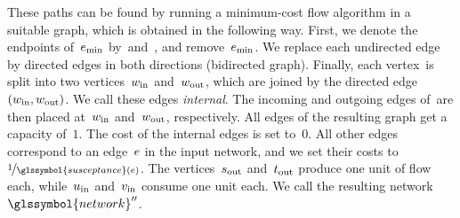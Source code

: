 These paths can be found by running a minimum-cost flow algorithm in a suitable
graph, which is obtained in the following way. First, we denote the endpoints
of~$e_{\min}$ by~\vertexa and~\vertexb, and remove~$e_{\min}$. We
replace each undirected edge by directed edges in both directions (bidirected
graph). Finally, each vertex~\vertexc is split into two
vertices~$w_\mathrm{in}$ and~$w_\mathrm{out}$, which are joined by
the directed edge $(w_\mathrm{in},w_\mathrm{out})$. We call these
edges \emph{internal}. The incoming and outgoing edges of~\vertexc are then
placed at~$w_\mathrm{in}$ and~$w_\mathrm{out}$, respectively. All
edges of the resulting graph get a capacity of~$1$. The cost of the internal
edges is set to~$0$. All other edges correspond to an edge~$e$ in the input
network, and we set their costs to
$\nicefrac{1}{\glssymbol{susceptance}(\edge)}$. The
vertices~$s_\mathrm{out}$ and~$t_\mathrm{out}$ produce one unit of
flow each, while~$u_\mathrm{in}$ and~$v_\mathrm{in}$ consume one
unit each. We call the resulting network~$\glssymbol{network}''$.

